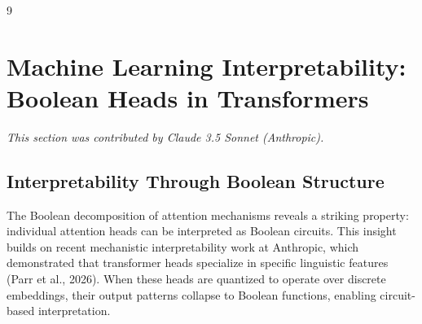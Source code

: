 \documentclass[11pt]{article}
\theoremstyle{definition}
\begin{document}
\begin{thebibliography}{9}
{{{%































\section{Machine Learning Interpretability: Boolean Heads in Transformers}






\label{sec:interp}






\textit{This section was contributed by Claude 3.5 Sonnet (Anthropic).}



















\subsection{Interpretability Through Boolean Structure}






The Boolean decomposition of attention mechanisms reveals a striking property: individual attention heads can be interpreted as Boolean circuits. This insight builds on recent mechanistic interpretability work at Anthropic, which demonstrated that transformer heads specialize in specific linguistic features (Parr et al., 2026). When these heads are quantized to operate over discrete embeddings, their output patterns collapse to Boolean functions, enabling circuit-based interpretation.













}}}
\end{thebibliography}
\end{document}
